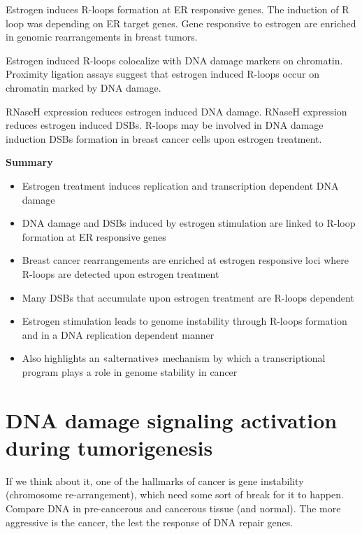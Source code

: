 Estrogen induces R-loops formation at ER responsive genes. The induction of R loop was depending on ER target genes. Gene responsive to estrogen are enriched in genomic rearrangements in breast tumors. 

Estrogen induced R-loops colocalize with DNA damage markers on chromatin. Proximity ligation assays suggest that estrogen induced R-loops occur on chromatin marked by DNA damage.

RNaseH expression reduces estrogen induced DNA damage. RNaseH expression reduces estrogen induced DSBs. R-loops may be involved in DNA damage induction DSBs formation in breast cancer cells upon estrogen treatment.

\textbf{Summary}
\begin{itemize}
\tightlist
\item
  Estrogen treatment induces replication and transcription dependent DNA damage
\item
  DNA damage and DSBs induced by estrogen stimulation are linked to R-loop formation at ER responsive genes
\item
  Breast cancer rearrangements are enriched at estrogen responsive loci where R-loops are detected upon estrogen treatment
\item
  Many DSBs that accumulate upon estrogen treatment are R-loops dependent
\item
  Estrogen stimulation leads to genome instability through R-loops formation and in a DNA
  replication dependent manner
\item
  Also highlights an «alternative» mechanism by which a transcriptional program plays a role in genome stability in cancer
\end{itemize}

\hypertarget{dna-damage-signaling-activation-during-tumorigenesis}{%
\section{DNA damage signaling activation during
tumorigenesis}\label{dna-damage-signaling-activation-during-tumorigenesis}}

If we think about it, one of the hallmarks of cancer is gene instability (chromosome re-arrangement), which need some sort of break for it to happen. Compare DNA in pre-cancerous and cancerous tissue (and normal).
The more aggressive is the cancer, the lest the response of DNA repair genes. 

